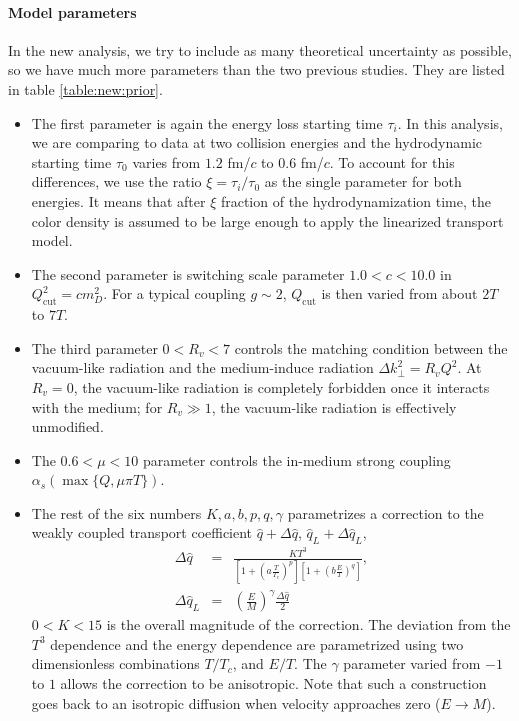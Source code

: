 \paragraph{Model parameters}
In the new analysis, we try to include as many theoretical uncertainty as possible, so we have much more parameters than the two previous studies.
They are listed in table \ref{table:new:prior}.
\begin{itemize}
\item The first parameter is again the energy loss starting time $\tau_i$.
In this analysis, we are comparing to data at two collision energies and the hydrodynamic starting time $\tau_0$ varies from $1.2$ fm/$c$ to $0.6$ fm/$c$.
To account for this differences, we use the ratio $\xi = \tau_i/\tau_0$ as the single parameter for both energies.
It means that after $\xi$ fraction of the hydrodynamization time, the color density is assumed to be large enough to apply the linearized transport  model.
\item The second parameter is switching scale parameter $1.0 < c < 10.0$ in $Q_{\textrm{cut}}^2 = c m_D^2$. For a typical coupling $g\sim 2$, $Q_{\textrm{cut}}$ is then varied from about $2T$ to $7T$.
\item The third parameter $0<R_v<7$ controls the matching condition between the vacuum-like radiation and the medium-induce radiation $\Delta k_\perp^2 = R_v Q^2$.
At $R_v = 0$, the vacuum-like radiation is completely forbidden once it interacts with the medium; for $R_v \gg 1$, the vacuum-like radiation is effectively unmodified.
\item The $0.6 < \mu < 10$ parameter controls the in-medium strong coupling $\alpha_s(\max\{Q, \mu\pi T\})$.
\item The rest of the six numbers $K,a,b,p,q, \gamma$ parametrizes a correction to the weakly coupled transport coefficient $\hat{q} + \Delta\hat{q}$, $\hat{q}_L + \Delta\hat{q}_L$,
\begin{eqnarray}
\Delta\hat{q} &=& \frac{K T^3}{\left[1+\left(a\frac{T}{T_c}\right)^p\right]\left[1+\left(b\frac{E}{T}\right)^q\right]}, \\
\Delta\hat{q}_L &=& \left(\frac{E}{M}\right)^\gamma \frac{\Delta\hat{q}}{2}
\end{eqnarray}
$0 < K < 15$ is the overall magnitude of the correction. 
The deviation from the $T^3$ dependence and the energy dependence are parametrized using two dimensionless combinations $T/T_c$, and $E/T$.
The $\gamma$ parameter varied from $-1$ to $1$ allows the correction to be anisotropic.
Note that such a construction goes back to an isotropic diffusion when velocity approaches zero ($E\rightarrow M$).
\end{itemize}
